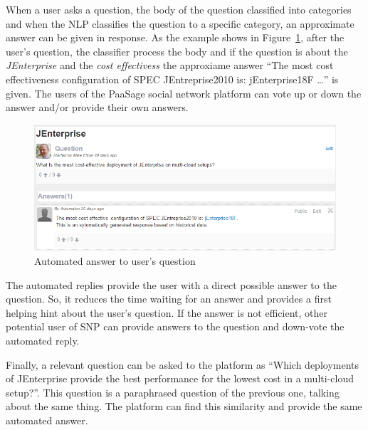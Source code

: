 When a user asks a question, the body of the question classified into categories and when the NLP classifies the question to a specific category, an approximate answer can be given in response. As the example shows in Figure~\ref{fig:nlp_example}, after the user's question, the classifier process the body and if the question is about the {\it JEnterprise} and the {\it cost effectivess} the approxiame answer ``The most cost effectiveness configuration of SPEC JEntreprise2010 is: jEnterprise18F \ldots'' is given. The users of the PaaSage social network platform can vote up or down the answer and/or provide their own answers.

\begin{figure}
  \centering
  \includegraphics[scale=0.6]{./fig/nlp_example.png}
  \caption{Automated answer to user's question}
  \label{fig:nlp_example}
\end{figure}

The automated replies provide the user with a direct possible answer to the question. So, it reduces the time waiting for an answer and provides a first helping hint about the user's question. If the answer is not efficient, other potential user of SNP can provide answers to the question and down-vote the automated reply.

Finally, a relevant question can be asked to the platform as ``Which deployments of JEnterprise provide the best performance for the lowest cost in a multi-cloud setup?''. This question is a paraphrased question of the previous one, talking about the same thing. The platform can find this similarity and provide the same automated answer.

